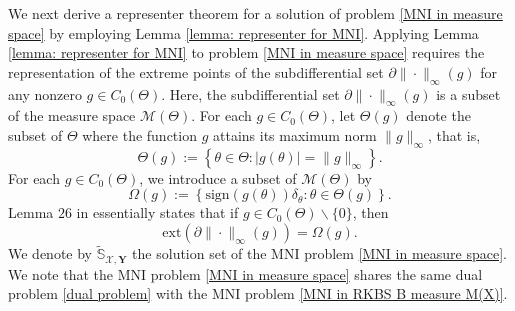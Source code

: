 \documentclass[11pt]{article}
\begin{document}
We next derive a representer theorem for a solution of problem \eqref{MNI in measure space} by employing Lemma \ref{lemma: representer for MNI}. 
Applying Lemma \ref{lemma: representer for MNI} to problem \eqref{MNI in measure space} requires the representation of the extreme points of the subdifferential set $\partial\|\cdot\|_\infty(g)$ for any nonzero $g\in C_0(\Theta)$. Here, the subdifferential set $\partial\|\cdot\|_\infty(g)$ is a subset of the measure space $\mathcal{M}(\Theta)$. 
For each $g\in C_0(\Theta)$, let $\Theta(g)$ denote the subset of $\Theta$ where the function $g$ attains its maximum norm $\|g\|_\infty$, that is, 
\begin{equation*}\label{def: infinity set for function}
    \Theta(g):=\left\{\theta\in \Theta:|g(\theta)|=\|g\|_\infty\right\}.
\end{equation*}
For each $g\in C_0(\Theta)$, we introduce a subset of $\mathcal{M}(\Theta)$ by 
\begin{equation}\label{def: Omage f}
    \Omega(g):=\left\{\mathrm{sign}(g(\theta))\delta_\theta:\theta\in\Theta(g)\right\}.
\end{equation}
Lemma $26$ in \cite{wang2023sparse} essentially states that if $g\in C_0(\Theta)\backslash\{0\}$, then
\begin{equation}\label{extreme points of partial infinity norm}
\mathrm{ext}\left(\partial\|\cdot\|_{\infty}(g)\right)=\Omega(g).
\end{equation}
We denote by $\widetilde{\mathbb{S}}_{\mathcal{X},\mathbf{Y}}$ the solution set of the MNI problem \eqref{MNI in measure space}. We note that the MNI problem \eqref{MNI in measure space} shares the same dual problem \eqref{dual problem} with the MNI problem \eqref{MNI in RKBS B measure M(X)}. 
\end{document}
